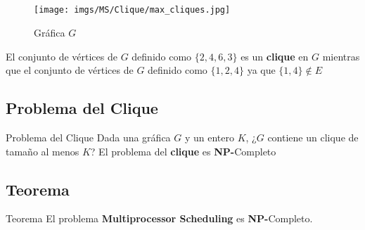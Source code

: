 \documentclass[spanish, xcolor=dvipsnames, aspectratio=169]{beamer}
\newcommand{\subsectiontitle}{}
\begin{document}
\subsection{\subsectiontitle}
\begin{frame}{\subsectiontitle}
\begin{figure}
    \centering
    \texttt{[image: imgs/MS/Clique/max\_cliques.jpg]}
    \caption{Gráfica \( G \)}
\end{figure}
\end{frame}
\begin{frame}{\subsectiontitle}
    El conjunto de vértices de \(G\) definido como \( \{2, 4, 6, 3 \} \) es un \textbf{clique} en \(G\) mientras que el conjunto de vértices de \( G \) definido como \( \{ 1, 2, 4 \} \) ya que \( \{ 1, 4 \} \notin E\)
\end{frame}
\renewcommand{\subsectiontitle}{Problema del Clique}
\subsection{\subsectiontitle}
\begin{frame}{\subsectiontitle}
Dada una gráfica \(G\) y un entero \(K\), ¿\(G\) contiene un clique de tamaño al menos \(K\)?
\newline 
El problema del \textbf{clique} es \textbf{NP-}Completo
\end{frame}
\renewcommand{\subsectiontitle}{Teorema}
\subsection{\subsectiontitle}
\begin{frame}{\subsectiontitle}
El problema \textbf{Multiprocessor Scheduling} es \textbf{NP-}Completo.
\end{frame}
\renewcommand{\subsectiontitle}{Demostración}
\end{document}
